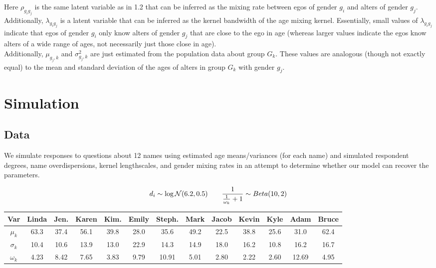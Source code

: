 \documentclass[12pt]{article}
\begin{document}
\noindent Here $\rho_{g_ig_j}$ is the same latent variable as in 1.2 that can be inferred as the mixing rate between egos of gender $g_i$ and alters of gender $g_j$. Additionally, $\lambda_{g_ig_j}$ is a latent variable that can be inferred as the kernel bandwidth of the age mixing kernel. Essentially, small values of $\lambda_{g_ig_j}$ indicate that egos of gender $g_i$ only know alters of gender $g_j$ that are close to the ego in age (whereas larger values indicate the egos know alters of a wide range of ages, not necessarily just those close in age).\\

\noindent Additionally, $\mu_{g_j,k}$ and $\sigma_{g_j,k}^2$ are just estimated from the population data about group $G_k$. These values are analogous (though not exactly equal) to the mean and standard deviation of the ages of alters in group $G_k$ with gender $g_j$.

\pagebreak
\section{Simulation}
\subsection{Data}
We simulate responses to questions about 12 names using estimated age means/variances (for each name) and simulated respondent degrees, name overdispersions, kernel lengthscales, and gender mixing rates in an attempt to determine whether our model can recover the parameters. 

$$d_i \sim \log\mathcal{N}(6.2,0.5) \hspace{20 pt}  \frac{1}{ \frac{1}{\omega_k}+1} \sim Beta(10,2) 
$$

\noindent \begin{tabular}{c | cccccccccccc} 
Var & Linda & Jen. & Karen & Kim. & Emily & Steph. & Mark & Jacob & Kevin & Kyle & Adam & Bruce \\
\hline
$\mu_k$ & 63.3 & 37.4 & 56.1 & 39.8 & 28.0 & 35.6 & 49.2 & 22.5 & 38.8  & 25.6 & 31.0 & 62.4 \\
$\sigma_k$ & 10.4 & 10.6 & 13.9 & 13.0 & 22.9 & 14.3 & 14.9 & 18.0 & 16.2 & 10.8 & 16.2 & 16.7  \\
$\omega_k$ & 4.23 & 8.42 & 7.65 & 3.83 & 9.79 & 10.91 & 5.01 & 2.80 & 2.22 & 2.60 & 12.69 & 4.95  \\
\end{tabular}\\
\end{document}
